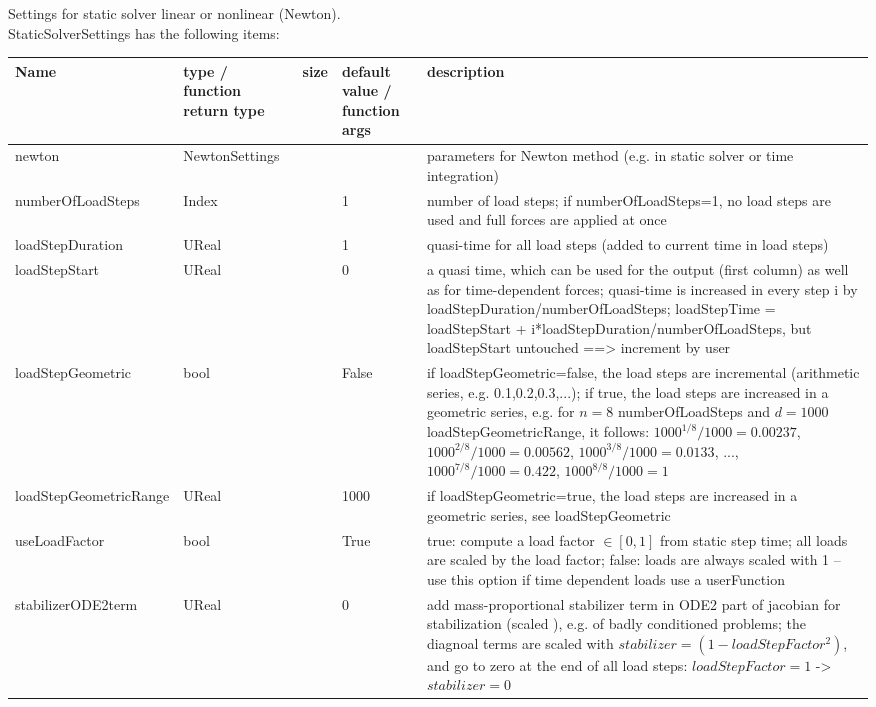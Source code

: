  \label{sec_StaticSolverSettings}
Settings for static solver linear or nonlinear (Newton).\\ 
%
StaticSolverSettings has the following items:
\begin{center}
  \footnotesize
  \begin{longtable}{| p{4.2cm} | p{2.5cm} | p{0.3cm} | p{3.0cm} | p{6cm} |}
    \hline
    \bf Name & \bf type / function return type & \bf size & \bf default value / function args & \bf description \\ \hline
    newton &     NewtonSettings &      &      &     parameters for Newton method (e.g. in static solver or time integration)\\ \hline
    numberOfLoadSteps &     Index &      &     1 &     number of load steps; if numberOfLoadSteps=1, no load steps are used and full forces are applied at once\\ \hline
    loadStepDuration &     UReal &      &     1 &     quasi-time for all load steps (added to current time in load steps)\\ \hline
    loadStepStart &     UReal &      &     0 &     a quasi time, which can be used for the output (first column) as well as for time-dependent forces; quasi-time is increased in every step i by loadStepDuration/numberOfLoadSteps; loadStepTime = loadStepStart + i*loadStepDuration/numberOfLoadSteps, but loadStepStart untouched ==> increment by user\\ \hline
    loadStepGeometric &     bool &      &     False &     if loadStepGeometric=false, the load steps are incremental (arithmetic series, e.g. 0.1,0.2,0.3,...); if true, the load steps are increased in a geometric series, e.g. for $n=8$ numberOfLoadSteps and $d = 1000$ loadStepGeometricRange, it follows: $1000^{1/8}/1000=0.00237$, $1000^{2/8}/1000=0.00562$, $1000^{3/8}/1000=0.0133$, ..., $1000^{7/8}/1000=0.422$, $1000^{8/8}/1000=1$\\ \hline
    loadStepGeometricRange &     UReal &      &     1000 &     if loadStepGeometric=true, the load steps are increased in a geometric series, see loadStepGeometric\\ \hline
    useLoadFactor &     bool &      &     True &     true: compute a load factor $\in [0,1]$ from static step time; all loads are scaled by the load factor; false: loads are always scaled with 1 -- use this option if time dependent loads use a userFunction\\ \hline
    stabilizerODE2term &     UReal &      &     0 &     add mass-proportional stabilizer term in ODE2 part of jacobian for stabilization (scaled ), e.g. of badly conditioned problems; the diagnoal terms are scaled with $stabilizer = (1-loadStepFactor^2)$, and go to zero at the end of all load steps: $loadStepFactor=1$ -> $stabilizer = 0$\\ \hline

\end{longtable}
\end{center}

